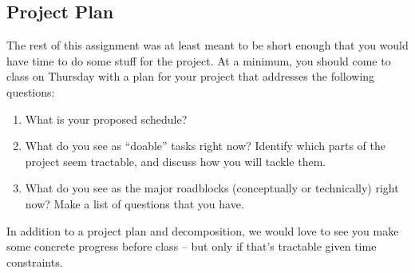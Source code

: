 \documentclass{tufte-handout}
\begin{document}
\begin{enumerate}[resume]
\section{Project Plan}

The rest of this assignment was at least meant to be short enough that you would have time to do some stuff for the project.  At a minimum, you should come to class on Thursday with a plan for your project that addresses the following questions:

\begin{enumerate}
\item What is your proposed schedule?
\item What do you see as ``doable'' tasks right now?  Identify which parts of the project seem tractable, and discuss how you will tackle them.
\item What do you see as the major roadblocks (conceptually or technically) right now?  Make a list of questions that you have.
\end{enumerate}

In addition to a project plan and decomposition, we would love to see you make some concrete progress before class -- but only if that's tractable given time constraints.

\end{enumerate}


 
\end{document}
